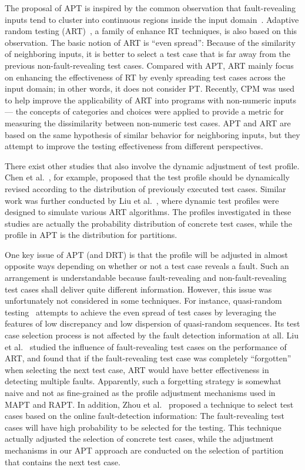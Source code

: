 \documentclass[10pt,journal,compsoc]{IEEEtran}
\begin{document}
The proposal of APT is inspired by the common observation that fault-revealing inputs tend to cluster into continuous regions inside the input domain~\cite{White80, Ammann88, Finelli91, Bishop93, Koru08}. Adaptive random testing (ART)~\cite{Chen10}, a family of enhance RT techniques, is also based on this observation. The basic notion of ART is ``even spread'': Because of the similarity of neighboring inputs, it is better to select a test case that is far away from the previous non-fault-revealing test cases. Compared with APT, ART mainly focus on enhancing the effectiveness of RT by evenly spreading test cases across the input domain; in other words, it does not consider PT. Recently, CPM was used to help improve the applicability of ART into programs with non-numeric inputs~\cite{Barus16} --- the concepts of categories and choices were applied to provide a metric for measuring the dissimilarity between non-numeric test cases.
APT and ART are based on the same hypothesis of similar behavior for neighboring inputs, but they attempt to improve the testing effectiveness from different perspectives.

There exist other studies that also involve the dynamic adjustment of test profile. Chen et al.~\cite{Chen09}, for example, proposed that the test profile should be dynamically revised according to the distribution of previously executed test cases. Similar work was further conducted by Liu et al.~\cite{Liu11}, where dynamic test profiles were designed to simulate various ART algorithms. The profiles investigated in these studies are actually the probability distribution of concrete test cases, while the profile in APT is the distribution for partitions.

One key issue of APT (and DRT) is that the profile will be adjusted in almost opposite ways depending on whether or not a test case reveals a fault. Such an arrangement is understandable because fault-revealing and non-fault-revealing test cases shall deliver quite different information. However, this issue was unfortunately not considered in some techniques. For instance, quasi-random testing~\cite{Chen07, Liu16} attempts to achieve the even spread of test cases by leveraging the features of low discrepancy and low dispersion of quasi-random sequences. Its test case selection process is not affected by the fault detection information at all. Liu et al.~\cite{Liu12} studied the influence of fault-revealing test cases on the performance of ART, and found that if the fault-revealing test case was completely ``forgotten'' when selecting the next test case, ART would have better effectiveness in detecting multiple faults. Apparently, such a forgetting strategy is somewhat naive and not as fine-grained as the profile adjustment mechanisms used in MAPT and RAPT. In addition, Zhou et al.~\cite{Zhou09} proposed a technique to select test cases based on the online fault-detection information: The fault-revealing test cases will have high probability to be selected for the testing. This technique actually adjusted the selection of concrete test cases, while the adjustment mechanisms in our APT approach are conducted on the selection of partition that contains the next test case.
\end{document}
